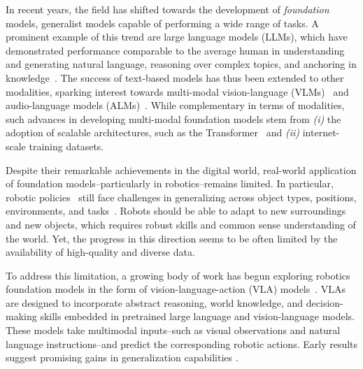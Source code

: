 In recent years, the field has shifted towards the development of \emph{foundation} models, generalist models capable of performing a wide range of tasks.
A prominent example of this trend are large language models (LLMs), which have demonstrated performance comparable to the average human in understanding and generating natural language, reasoning over complex topics, and anchoring in knowledge~\citep{GPT3,GPT4,Llama3,Gemini,Mistral7B}. 
The success of text-based models has thus been extended to other modalities, sparking interest towards multi-modal vision-language (VLMs)~\citep{alayrac2022flamingo,PaLI-3,kosmoshuang2023language,LLaVA-1.5,chen2024internvl25,shukor2023unival} and audio-language models (ALMs)~\citep{defossez2024moshi,das2024speechverse,borsos2023audiolm}. 
While complementary in terms of modalities, such advances in developing multi-modal foundation models stem from \emph{(i)} the adoption of scalable architectures, such as the Transformer~\citep{vaswani2017attention} and \emph{(ii)} internet-scale training datasets.

Despite their remarkable achievements in the digital world, real-world application of foundation models--particularly in robotics--remains limited. 
In particular, robotic policies~\citep{zhao2023learningact,chi2024diffusionpolicy,lee2024behavior,Hansen2022tdmpc} still face challenges in generalizing across object types, positions, environments, and tasks~\citep{xie2024decomposing,ebert2021bridge}. 
Robots should be able to adapt to new surroundings and new objects, which requires robust skills and common sense understanding of the world. Yet, the progress in this direction seems to be often limited by the availability of high-quality and diverse data.

To address this limitation, a growing body of work has begun exploring robotics foundation models in the form of vision-language-action (VLA) models~\citep{team2024octo,o2024openrtx,brohan2023rt2,kimopenvla,black2024pi_0,bjorck2025gr00t,li2024vision,huang2024embodied}.
VLAs are designed to incorporate abstract reasoning, world knowledge, and decision-making skills embedded in pretrained large language and vision-language models. 
These models take multimodal inputs--such as visual observations and natural language instructions--and predict the corresponding robotic actions. 
Early results suggest promising gains in generalization capabilities \citep{black2024pi_0,brohan2023rt2}.

